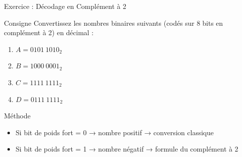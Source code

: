 \documentclass[aspectratio=1610]{beamer}
\begin{document}
\begin{frame}{Exercice : Décodage en Complément à 2}

  \begin{exampleblock}{Consigne}
    Convertissez les nombres binaires suivants (codés sur 8 bits en complément à 2) en décimal :
  \end{exampleblock}

  \vspace{0.3cm}

  \begin{enumerate}
    \item $A = 0101\ 1010_2$
    \item $B = 1000\ 0001_2$
    \item $C = 1111\ 1111_2$
    \item $D = 0111\ 1111_2$
  \end{enumerate}

  \vspace{0.3cm}
  \pause

  \begin{alertblock}{Méthode}
    \begin{itemize}
      \item Si bit de poids fort = 0 → nombre positif → conversion classique
      \item Si bit de poids fort = 1 → nombre négatif → formule du complément à 2
    \end{itemize}
  \end{alertblock}

\end{frame}
\end{document}
